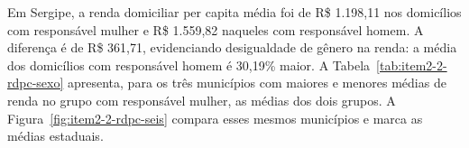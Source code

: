 Em Sergipe, a renda domiciliar per capita média foi de R\$ 1.198,11 nos domicílios com responsável mulher e R\$ 1.559,82 naqueles com responsável homem. A diferença é de R\$ 361,71, evidenciando desigualdade de gênero na renda: a média dos domicílios com responsável homem é 30,19\% maior. A Tabela~\ref{tab:item2-2-rdpc-sexo} apresenta, para os três municípios com maiores e menores médias de renda no grupo com responsável mulher, as médias dos dois grupos. A Figura~\ref{fig:item2-2-rdpc-seis} compara esses mesmos municípios e marca as médias estaduais.
